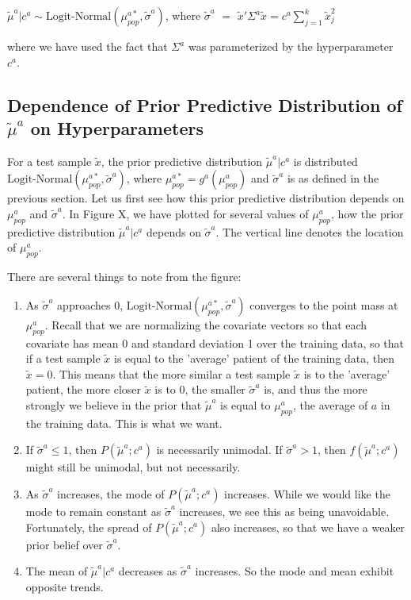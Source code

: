\begin{obs}
  $\tilde{\mu}^a|c^a \sim \textrm{Logit-Normal}(\mu_{pop}^{a*},  \tilde{\sigma}^a)$, where $\tilde{\sigma}^a$ $=$ $\tilde{x}'\Sigma^a\tilde{x} = c^a\sum_{j=1}^k \tilde{x}_j^2$
\end{obs}

where we have used the fact that $\Sigma^a$ was parameterized by the hyperparameter $c^a$.

\subsection{Dependence of Prior Predictive Distribution of $\tilde{\mu}^a$ on Hyperparameters}

For a test sample $\tilde{x}$, the prior predictive distribution $\tilde{\mu}^a|c^a$ is distributed $\textrm{Logit-Normal}(\mu_{pop}^{a*}, \tilde{\sigma}^a)$, where $\mu_{pop}^{a*} = g^a(\mu_{pop}^{a})$ and $\tilde{\sigma}^a$ is as defined in the previous section.  Let us first see how this prior predictive distribution depends on $\mu_{pop}^{a}$ and $\tilde{\sigma}^a$.  In Figure X, we have plotted for several values of $\mu_{pop}^{a}$, how the prior predictive distribution $\tilde{\mu}^a|c^a$ depends on $\tilde{\sigma}^a$.  The vertical line denotes the location of $\mu_{pop}^{a}$.

There are several things to note from the figure:
\begin{enumerate}
\item As $\tilde{\sigma}^a$ approaches 0, $\textrm{Logit-Normal}(\mu_{pop}^{a*}, \tilde{\sigma}^a)$ converges to the point mass at $\mu_{pop}^{a}$.  Recall that we are normalizing the covariate vectors so that each covariate has mean 0 and standard deviation 1 over the training data, so that if a test sample $\tilde{x}$ is equal to the 'average' patient of the training data, then $\tilde{x} = 0$.  This means that the more similar a test sample $\tilde{x}$ is to the 'average' patient, the more closer $\tilde{x}$ is to 0, the smaller $\tilde{\sigma}^a$ is, and thus the more strongly we believe in the prior that $\tilde{\mu}^a$ is equal to $\mu_{pop}^{a}$, the average of $a$ in the training data.  This is what we want.
\item If $\tilde{\sigma}^a \leq 1$, then $P(\tilde{\mu}^a;c^a)$ is necessarily unimodal.  If $\tilde{\sigma}^a > 1$, then $f(\tilde{\mu}^a;c^a)$ might still be unimodal, but not necessarily.
\item As $\tilde{\sigma}^a$ increases, the mode of $P(\tilde{\mu}^a;c^a)$ increases.  While we would like the mode to remain constant as $\tilde{\sigma}^a$ increases, we see this as being unavoidable.  Fortunately, the spread of $P(\tilde{\mu}^a;c^a)$ also increases, so that we have a weaker prior belief over $\tilde{\sigma}^a$.
\item The mean of $\tilde{\mu}^a|c^a$ decreases as $\tilde{\sigma}^a$ increases.  So the mode and mean exhibit opposite trends.
\end{enumerate}

